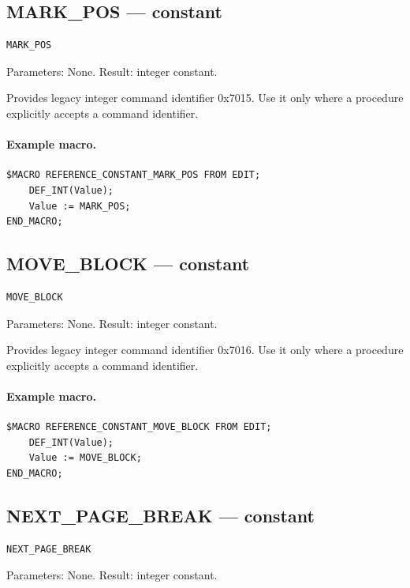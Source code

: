 \documentclass[a4paper,10pt,twoside,openany]{book}
\begin{document}
\label{prim:constant-mark-pos}
\subsection*{MARK\_POS --- constant}
\begin{verbatim}
MARK_POS
\end{verbatim}
Parameters: None. Result: integer constant.

Provides legacy integer command identifier 0x7015. Use it only where a procedure explicitly accepts a command identifier.

\paragraph{Example macro.}
\begin{verbatim}
$MACRO REFERENCE_CONSTANT_MARK_POS FROM EDIT;
    DEF_INT(Value);
    Value := MARK_POS;
END_MACRO;
\end{verbatim}

\label{prim:constant-move-block}
\subsection*{MOVE\_BLOCK --- constant}
\begin{verbatim}
MOVE_BLOCK
\end{verbatim}
Parameters: None. Result: integer constant.

Provides legacy integer command identifier 0x7016. Use it only where a procedure explicitly accepts a command identifier.

\paragraph{Example macro.}
\begin{verbatim}
$MACRO REFERENCE_CONSTANT_MOVE_BLOCK FROM EDIT;
    DEF_INT(Value);
    Value := MOVE_BLOCK;
END_MACRO;
\end{verbatim}

\label{prim:constant-next-page-break}
\subsection*{NEXT\_PAGE\_BREAK --- constant}
\begin{verbatim}
NEXT_PAGE_BREAK
\end{verbatim}
Parameters: None. Result: integer constant.
\end{document}
